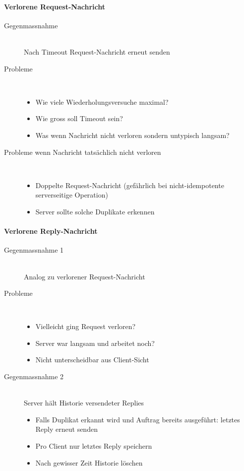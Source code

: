\documentclass[10pt,a4paper]{article}
\begin{document}
\paragraph{Verlorene Request-Nachricht}
\begin{description}
\item[Gegenmassnahme]\hfill\\
Nach Timeout Request-Nachricht erneut senden
\item[Probleme]\hfill\\
\begin{itemize}[topsep=-100ex]
\item Wie viele Wiederholungsversuche maximal?
\item Wie gross soll Timeout sein?
\item Was wenn Nachricht nicht verloren sondern untypisch langsam?
\end{itemize}
\item[Probleme wenn Nachricht tatsächlich nicht verloren]\hfill\\
\begin{itemize}[topsep=-100ex]
\item Doppelte Request-Nachricht (gefährlich bei nicht-idempotente serverseitige Operation)
\item Server sollte solche Duplikate erkennen
\end{itemize}
\end{description}

\paragraph{Verlorene Reply-Nachricht}
\begin{description}
\item[Gegenmassnahme 1]\hfill\\
Analog zu verlorener Request-Nachricht
\item[Probleme]\hfill\\
\begin{itemize}[topsep=-100ex]
\item Vielleicht ging Request verloren?
\item Server war langsam und arbeitet noch?
\item Nicht unterscheidbar aus Client-Sicht
\end{itemize}
\item[Gegenmassnahme 2]\hfill\\
Server hält Historie versendeter Replies
\begin{itemize}[topsep=-100ex]
\item Falls Duplikat erkannt wird und Auftrag bereits ausgeführt: letztes Reply erneut senden
\item Pro Client nur letztes Reply speichern
\item Nach gewisser Zeit Historie löschen
\end{itemize}
\end{description}
\end{document}
